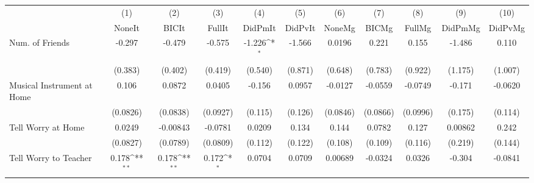 {
\def\sym#1{\ifmmode^{#1}\else\(^{#1}\)\fi}
\begin{tabular}{l*{10}{c}}
\toprule
            &\multicolumn{1}{c}{(1)}&\multicolumn{1}{c}{(2)}&\multicolumn{1}{c}{(3)}&\multicolumn{1}{c}{(4)}&\multicolumn{1}{c}{(5)}&\multicolumn{1}{c}{(6)}&\multicolumn{1}{c}{(7)}&\multicolumn{1}{c}{(8)}&\multicolumn{1}{c}{(9)}&\multicolumn{1}{c}{(10)}\\
            &\multicolumn{1}{c}{NoneIt}&\multicolumn{1}{c}{BICIt}&\multicolumn{1}{c}{FullIt}&\multicolumn{1}{c}{DidPmIt}&\multicolumn{1}{c}{DidPvIt}&\multicolumn{1}{c}{NoneMg}&\multicolumn{1}{c}{BICMg}&\multicolumn{1}{c}{FullMg}&\multicolumn{1}{c}{DidPmMg}&\multicolumn{1}{c}{DidPvMg}\\
\midrule
Num. of Friends&      -0.297         &      -0.479         &      -0.575         &      -1.226\sym{*}  &      -1.566         &      0.0196         &       0.221         &       0.155         &      -1.486         &       0.110         \\
            &     (0.383)         &     (0.402)         &     (0.419)         &     (0.540)         &     (0.871)         &     (0.648)         &     (0.783)         &     (0.922)         &     (1.175)         &     (1.007)         \\
\addlinespace
Musical Instrument at Home&       0.106         &      0.0872         &      0.0405         &      -0.156         &      0.0957         &     -0.0127         &     -0.0559         &     -0.0749         &      -0.171         &     -0.0620         \\
            &    (0.0826)         &    (0.0838)         &    (0.0927)         &     (0.115)         &     (0.126)         &    (0.0846)         &    (0.0866)         &    (0.0996)         &     (0.175)         &     (0.114)         \\
\addlinespace
Tell Worry at Home&      0.0249         &    -0.00843         &     -0.0781         &      0.0209         &       0.134         &       0.144         &      0.0782         &       0.127         &     0.00862         &       0.242         \\
            &    (0.0827)         &    (0.0789)         &    (0.0809)         &     (0.112)         &     (0.122)         &     (0.108)         &     (0.109)         &     (0.116)         &     (0.219)         &     (0.144)         \\
\addlinespace
Tell Worry to Teacher&       0.178\sym{**} &       0.178\sym{**} &       0.172\sym{*}  &      0.0704         &      0.0709         &     0.00689         &     -0.0324         &      0.0326         &      -0.304         &     -0.0841         \\

\end{tabular}}
